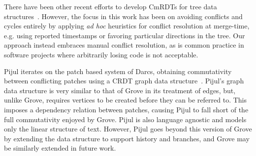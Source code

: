 There have been other recent efforts to develop CmRDTs for tree data structures~\cite{DBLP:conf/icdcs/PreguicaMSL09, Highly-Available}. However, the focus in this work has been on avoiding conflicts and cycles entirely by applying \emph{ad hoc} heuristics for conflict resolution at merge-time, e.g. using reported timestamps or favoring particular directions in the tree. Our approach instead embraces manual conflict resolution, as is common practice in software projects where arbitrarily losing code is not acceptable. 


Pijul iterates on the patch based system of Darcs, obtaining commutativity between conflicting patches using a CRDT graph data structure~\cite{pijul-talk}. Pijul's graph data structure is very similar to that of Grove in its treatment of edges, but, unlike Grove, requires vertices to be created before they can be referred to. This imposes a dependency relation between patches, causing Pijul to fall short of the full commutativity enjoyed by Grove.
Pijul is also language agnostic and models only the linear structure of text. However, Pijul goes beyond this version of Grove by extending the data structure to support history and branches, and Grove may be similarly extended in future work.











